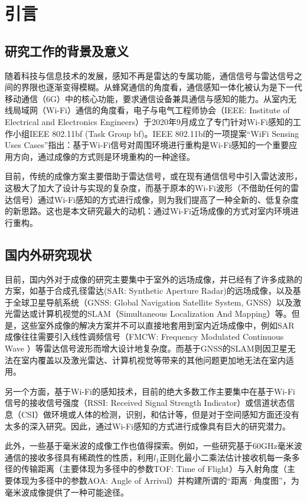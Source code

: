 \section{引言}
\subsection{研究工作的背景及意义}
随着科技与信息技术的发展，感知不再是雷达的专属功能，通信信号与雷达信号之间的界限也逐渐变得模糊。从蜂窝通信的角度看，通信感知一体化被认为是下一代移动通信（6G）中的核心功能，要求通信设备兼具通信与感知的能力\cite{ISAC}。从室内无线局域网（Wi-Fi）通信的角度看，电子与电气工程师协会（IEEE: Institute of Electrical and Electronics Engineers）于2020年9月成立了专门针对Wi-Fi感知的工作小组IEEE 802.11bf (Task Group bf)\cite{TGbf_PAR}。IEEE 802.11bf的一项提案``WiFi Sensing Uses Cases''\cite{TGbf_Use_Case}指出：基于Wi-Fi信号对周围环境进行重构是Wi-Fi感知的一个重要应用方向，通过成像的方式则是环境重构的一种途径。


目前，传统的成像方案主要借助于雷达信号，或在现有通信信号中引入雷达波形，这极大了加大了设计与实现的复杂度，而基于原本的Wi-Fi波形（不借助任何的雷达信号）通过Wi-Fi感知的方式进行成像，则为我们提高了一种全新的、低复杂度的新思路。这也是本文研究最大的动机：通过Wi-Fi近场成像的方式对室内环境进行重构。
\subsection{国内外研究现状}
目前，国内外对于成像的研究主要集中于室外的远场成像，并已经有了许多成熟的方案，如基于合成孔径雷达(SAR: Synthetic Aperture Radar)的远场成像\cite{indoorSAR}，以及基于全球卫星导航系统（GNSS: Global Navigation Satellite System, GNSS）以及激光雷达或计算机视觉的SLAM（Simultaneous Localization And Mapping）等\cite{NavigationSAR}。但是，这些室外成像的解决方案并不可以直接地套用到室内近场成像中，例如SAR成像往往需要引入线性调频信号（FMCW: Frequency Modulated Continuous Wave ）等雷达信号波形而增大设计地复杂度。而基于GNSS的SLAM则因卫星无法在室内覆盖以及激光雷达、计算机视觉等带来的其他问题更加地无法在室内适用。


另一个方面，基于Wi-Fi的感知技术，目前的绝大多数工作主要集中在基于Wi-Fi信号的接收信号强度（RSSI: Received Signal Strength Indicator）或信道状态信息（CSI）做环境或人体的检测，识别，和估计等\cite{ma2019wifi}，但是对于空间感知方面还没有太多的深入研究。因此，通过Wi-Fi感知的方式进行成像具有巨大的研究潜力。

此外，一些基于毫米波的成像工作也值得探索。例如，一些研究基于60GHz毫米波通信的接收多径具有稀疏性的性质，利用$l_1$正则化最小二乘法估计接收机每一条多径的传输距离（主要体现为多径中的参数TOF: Time of Flight）与入射角度（主要体现为多径中的参数AOA: Angle of Arrival）并构建所谓的``距离·角度图''，为毫米波成像提供了一种可能途径\cite{barneto2021millimeter}。

